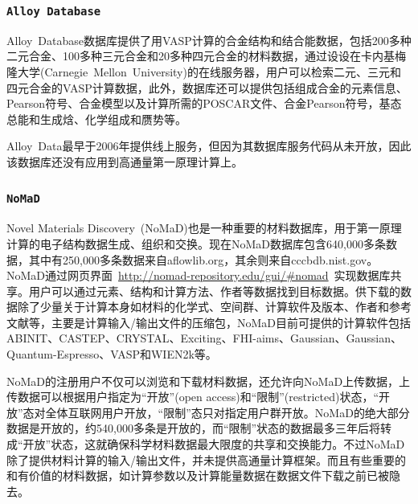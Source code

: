 \frame
{
\frametitle{\tt{Alloy Database}}
\textrm{Alloy~Database}数据库提供了用\textrm{VASP}计算的合金结构和结合能数据\cite{AlloyD_URL}，包括200多种二元合金、100多种三元合金和20多种四元合金的材料数据，通过设设在卡内基梅隆大学\textrm{(Carnegie~Mellon~University)}的在线服务器，用户可以检索二元、三元和四元合金的\textrm{VASP}计算数据，此外，数据库还可以提供包括组成合金的元素信息、\textrm{Pearson}符号、合金模型以及计算所需的\textrm{POSCAR}文件、合金\textrm{Pearson}符号，基态总能和生成焓、化学组成和赝势等。

\textrm{Alloy~Data}最早于2006年提供线上服务，但因为其数据库服务代码从未开放，因此该数据库还没有应用到高通量第一原理计算上。
}

\frame
{
\frametitle{\tt{NoMaD}}
\textrm{Novel Materials Discovery~(NoMaD)}也是一种重要的材料数据库，用于第一原理计算的电子结构数据生成、组织和交换\cite{NoMaD_URL}。现在\textrm{NoMaD}数据库包含640,000多条数据，其中有250,000多条数据来自\textrm{aflowlib.org}，其余则来自\textrm{cccbdb.nist.gov}。\textrm{NoMaD}通过网页界面~\textrm{\url{http://nomad-repository.edu/gui/\#nomad}}~实现数据库共享。用户可以通过元素、结构和计算方法、作者等数据找到目标数据。供下载的数据除了少量关于计算本身如材料的化学式、空间群、计算软件及版本、作者和参考文献等，主要是计算输入/输出文件的压缩包，\textrm{NoMaD}目前可提供的计算软件包括\textrm{ABINIT}、\textrm{CASTEP}、\textrm{CRYSTAL}、\textrm{Exciting}、\textrm{FHI-aims}、\textrm{Gaussian}、\textrm{Gaussian}、\textrm{Quantum-Espresso}、\textrm{VASP}和\textrm{WIEN2k}等。

\textrm{NoMaD}的注册用户不仅可以浏览和下载材料数据，还允许向\textrm{NoMaD}上传数据，上传数据可以根据用户指定为“开放”\textrm{(open access)}和“限制”\textrm{(restricted)}状态，“开放”态对全体互联网用户开放，“限制”态只对指定用户群开放。\textrm{NoMaD}的绝大部分数据是开放的，约540,000多条是开放的，而“限制”状态的数据最多三年后将转成“开放”状态，这就确保科学材料数据最大限度的共享和交换能力。不过\textrm{NoMaD}除了提供材料计算的输入/输出文件，并未提供高通量计算框架。而且有些重要的和有价值的材料数据，如计算参数以及计算能量数据在数据文件下载之前已被隐去。
}

